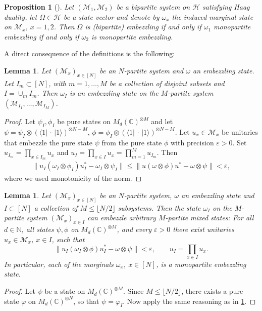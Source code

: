 \documentclass[a4paper, 10pt, onecolumn, accepted=2025-07-22]{quantumarticle}
\newtheorem{lemma}[theorem]{Lemma}
\newtheorem{proposition}[theorem]{Proposition}
\theoremstyle{definition}
\newcommand{\ket}[1]{|#1\rangle}
\newcommand{\bra}[1]{\langle#1|}
\newcommand{\norm}[1]{\lVert #1\rVert}
\newcommand{\ox}{\otimes}
\newcommand{\mc}{\mathcal}
\newcommand{\eps}{\varepsilon}
\def\CC{{\mathbb C}}
\def\H{{\mc H}}
\def\M{{\mc M}}
\def\NN{{\mathbb N}}
\newcommand*{\1}{\text{\usefont{U}{bbold}{m}{n}1}}
\newcommand{\placeholder}[0]{{\,\cdot\,}}
\begin{document}
\begin{proposition}[{\cite[Thm.~11]{long_paper}}]
    Let $(\M_1,\M_2)$ be a bipartite system on $\H$ satisfying Haag duality, let $\Omega\in \H$ be a state vector and denote by $\omega_x$ the induced marginal state on $\M_x$, $x=1,2$.
    Then $\Omega$ is (bipartite) embezzling if and only if $\omega_1$ monopartite embezzling if and only if $\omega_2$ is monopartite embezzling.
\end{proposition}

A direct consequence of the definitions is the following:

\begin{lemma}\label{lem:subsystems-mbz}
    Let $(\M_x)_{x\in[N]}$ be an $N$-partite system and $\omega$ an embezzling state. 
    Let $I_m\subset [N]$, with $m=1,\ldots,M$ be a collection of disjoint subsets and $I=\cup_m I_m$. Then $\omega_I$ is an embezzling state on the $M$-partite system $(\M_{I_1},\ldots,\M_{I_M})$.
\end{lemma}
\begin{proof}
   Let $\psi_I,\phi_I$ be pure states on $M_d(\CC)^{\otimes M}$ and let $\psi = \psi_I \ox (\bra1\placeholder\ket1)^{\ox N-M}$, $\phi = \phi_I \ox (\bra1\placeholder\ket1)^{\ox N-M}$.  
   Let $u_x \in \M_x$ be unitaries that embezzle the pure state $\psi$ from the pure state $\phi$ with precision $\eps>0$. Set $u_{I_m} = \prod_{x\in I_m} u_x$ and $u_I = \prod_{x\in I}u_{x} = \prod_{m=1}^M u_{I_m}$. Then 
    \begin{align}
         \norm{u_I(\omega_I \ox \phi_I)u_I^* - \omega_I\ox \psi_I} \leq  \norm{u(\omega \ox \phi)u^* - \omega\ox \psi} <\eps,
    \end{align}
    where we used monotonicity of the norm.
\end{proof}

\begin{lemma}\label{lem:pure-to-mixed}
Let $(\M_x)_{x\in [N]}$ be an $N$-partite system, $\omega$ an embezzling state and $I\subset[N]$ a collection of $M\leq \lfloor N/2\rfloor$ subsystems.
Then the state $\omega_I$ on the $M$-partite system $(\M_x)_{x\in I}$ can embezzle arbitrary $M$-partite mixed states: For all $d\in\NN$, all states $\psi,\phi$ on $M_d(\CC)^{\ox M}$, and every $\eps>0$ there exist unitaries $u_x \in \M_{x}$, $x\in I$, such that
\begin{equation}
    \norm{u_I (\omega_I\ox\phi)u_I^*-\omega\ox\psi}<\eps, \qquad u_I=\prod_{x\in I}u_x.
\end{equation}
In particular, each of the marginals $\omega_x$, $x\in[N]$, is a monopartite embezzling state.
\end{lemma}
\begin{proof}
    Let $\psi$ be a state on $M_d(\CC)^{\otimes M}$. Since $M\leq \lfloor N/2\rfloor$, there exists a pure state $\varphi$ on $M_d(\CC)^{\otimes N}$, so that $\psi = \varphi_I$. 
    Now apply the same reasoning as in \cref{lem:subsystems-mbz}.
\end{proof}
\end{document}
